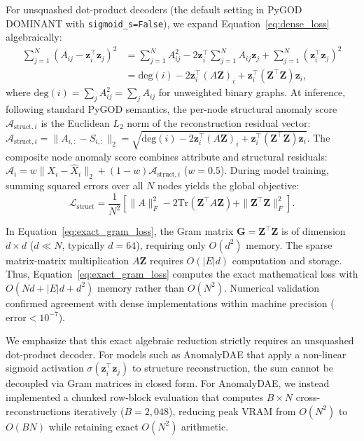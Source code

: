 \documentclass[applsci,article,submit,moreauthors,pdftex]{Definitions/mdpi}
\begin{document}
For unsquashed dot-product decoders (the default setting in PyGOD DOMINANT with \texttt{sigmoid\_s=False}), we expand Equation~\eqref{eq:dense_loss} algebraically:
\begin{align}
\sum_{j=1}^N \left(A_{ij} - \mathbf{z}_i^\top \mathbf{z}_j\right)^2 &= \sum_{j=1}^N A_{ij}^2 - 2 \mathbf{z}_i^\top \sum_{j=1}^N A_{ij} \mathbf{z}_j + \sum_{j=1}^N (\mathbf{z}_i^\top \mathbf{z}_j)^2 \nonumber \\
&= \mathrm{deg}(i) - 2 \mathbf{z}_i^\top \left(A \mathbf{Z}\right)_i + \mathbf{z}_i^\top \left(\mathbf{Z}^\top \mathbf{Z}\right) \mathbf{z}_i,
\label{eq:gram_identity}
\end{align}
where $\mathrm{deg}(i) = \sum_j A_{ij}^2 = \sum_j A_{ij}$ for unweighted binary graphs. At inference, following standard PyGOD semantics, the per-node structural anomaly score $\mathcal{A}_{\mathrm{struct}, i}$ is the Euclidean $L_2$ norm of the reconstruction residual vector: $\mathcal{A}_{\mathrm{struct}, i} = \|A_{i,:} - \hat{S}_{i,:}\|_2 = \sqrt{\mathrm{deg}(i) - 2 \mathbf{z}_i^\top (A \mathbf{Z})_i + \mathbf{z}_i^\top (\mathbf{Z}^\top \mathbf{Z}) \mathbf{z}_i}$. The composite node anomaly score combines attribute and structural residuals: $\mathcal{A}_i = w \|X_i - \hat{X}_i\|_2 + (1 - w) \mathcal{A}_{\mathrm{struct}, i}$ ($w=0.5$). During model training, summing squared errors over all $N$ nodes yields the global objective:
\begin{equation}
\mathcal{L}_{\mathrm{struct}} = \frac{1}{N^2} \left[ \|A\|_F^2 - 2 \mathrm{Tr}\left(\mathbf{Z}^\top A \mathbf{Z}\right) + \|\mathbf{Z}^\top \mathbf{Z}\|_F^2 \right].
\label{eq:exact_gram_loss}
\end{equation}

In Equation~\eqref{eq:exact_gram_loss}, the Gram matrix $\mathbf{G} = \mathbf{Z}^\top \mathbf{Z}$ is of dimension $d \times d$ ($d \ll N$, typically $d=64$), requiring only $O(d^2)$ memory. The sparse matrix-matrix multiplication $A \mathbf{Z}$ requires $O(|E|d)$ computation and storage. Thus, Equation~\eqref{eq:exact_gram_loss} computes the exact mathematical loss with $O(N d + |E| d + d^2)$ memory rather than $O(N^2)$. Numerical validation confirmed agreement with dense implementations within machine precision ($\text{error} < 10^{-7}$).

We emphasize that this exact algebraic reduction strictly requires an unsquashed dot-product decoder. For models such as AnomalyDAE that apply a non-linear sigmoid activation $\sigma(\mathbf{z}_i^\top \mathbf{z}_j)$ to structure reconstruction, the sum cannot be decoupled via Gram matrices in closed form. For AnomalyDAE, we instead implemented a chunked row-block evaluation that computes $B \times N$ cross-reconstructions iteratively ($B=2,048$), reducing peak VRAM from $O(N^2)$ to $O(B N)$ while retaining exact $O(N^2)$ arithmetic.
\end{document}
